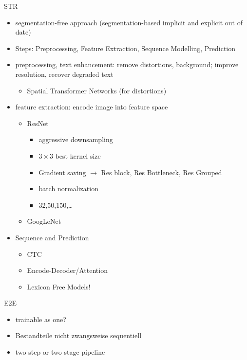 STR
\begin{itemize}
    \item segmentation-free approach (segmentation-based implicit and explicit out of date)
    \item Steps: Preprocessing, Feature Extraction, Sequence Modelling, Prediction
    \item preprocessing, text enhancement: remove distortions, background; improve resolution,
        recover degraded text
        \begin{itemize}
            \item Spatial Transformer Networks (for distortions)
        \end{itemize}
    \item feature extraction: encode image into feature space
        \begin{itemize}
            \item ResNet
                \begin{itemize}
                    \item aggressive downsampling
                    \item $3\times3$ best kernel size
                    \item Gradient saving $\rightarrow$ Res block, Res Bottleneck, Res Grouped
                    \item batch normalization
                    \item 32,50,150,\ldots
                \end{itemize}
            \item GoogLeNet
        \end{itemize}
    \item Sequence and Prediction
        \begin{itemize}
            \item CTC
            \item Encode-Decoder/Attention
            \item Lexicon Free Models!
        \end{itemize}
\end{itemize}

E2E
\begin{itemize}
    \item trainable as one?
    \item Bestandteile nicht zwangsweise sequentiell
    \item two step or two stage pipeline
\end{itemize}

